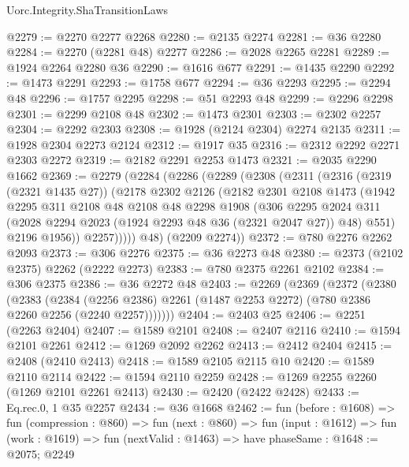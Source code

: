 \begin{lexlean}{Uorc.Integrity.ShaTransitionLaws}
\begin{coremodule}
@2279 := @2270 @2277 @2268
@2280 := @2135 @2274
@2281 := @36 @2280
@2284 := @2270 (@2281 @48) @2277
@2286 := @2028 @2265 @2281
@2289 := @1924 @2264 @2280 @36
@2290 := @1616 @677
@2291 := @1435 @2290
@2292 := @1473 @2291
@2293 := @1758 @677
@2294 := @36 @2293
@2295 := @2294 @48
@2296 := @1757 @2295
@2298 := @51 @2293 @48
@2299 := @2296 @2298
@2301 := @2299 @2108 @48
@2302 := @1473 @2301
@2303 := @2302 @2257
@2304 := @2292 @2303
@2308 := @1928 (@2124 @2304) @2274 @2135
@2311 := @1928 @2304 @2273 @2124
@2312 := @1917 @35
@2316 := @2312 @2292 @2271 @2303 @2272
@2319 := @2182 @2291 @2253 @1473
@2321 := @2035 @2290 @1662
@2369 := @2279
    (@2284
      (@2286
        (@2289
          (@2308
            (@2311
              (@2316
                (@2319 (@2321 @1435 @27))
                (@2178
                  @2302
                  @2126
                  (@2182
                    @2301
                    @2108
                    @1473
                    (@1942
                      @2295
                      @311
                      @2108
                      @48
                      @2108
                      @48
                      @2298
                      @1908
                      (@306
                        @2295
                        @2024
                        @311
                        (@2028 @2294 @2023 (@1924 @2293 @48 @36 (@2321 @2047 @27)) @48)
                        @551)
                      @2196
                      @1956))
                  @2257)))))
        @48)
      (@2209 @2274))
@2372 := @780 @2276 @2262 @2093
@2373 := @306 @2276
@2375 := @36 @2273 @48
@2380 := @2373 (@2102 @2375) @2262 (@2222 @2273)
@2383 := @780 @2375 @2261 @2102
@2384 := @306 @2375
@2386 := @36 @2272 @48
@2403 := @2269
    (@2369
      (@2372
        (@2380
          (@2383
            (@2384
              (@2256 @2386)
              @2261
              (@1487 @2253 @2272)
              (@780 @2386 @2260 @2256 (@2240 @2257)))))))
@2404 := @2403 @25
@2406 := @2251 (@2263 @2404)
@2407 := @1589 @2101
@2408 := @2407 @2116
@2410 := @1594 @2101 @2261
@2412 := @1269 @2092 @2262
@2413 := @2412 @2404
@2415 := @2408 (@2410 @2413)
@2418 := @1589 @2105 @2115 @10
@2420 := @1589 @2110 @2114
@2422 := @1594 @2110 @2259
@2428 := @1269 @2255 @2260 (@1269 @2101 @2261 @2413)
@2430 := @2420 (@2422 @2428)
@2433 := Eq.rec.{0, 1} @35 @2257
@2434 := @36 @1668
@2462 := fun (before : @1608) =>
  fun (compression : @860) =>
  fun (next : @860) =>
  fun (input : @1612) =>
  fun (work : @1619) =>
  fun (nextValid : @1463) =>
  have phaseSame : @1648 := @2075;
  @2249

\end{coremodule}
\end{lexlean}
